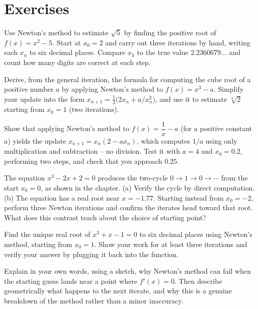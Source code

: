 \section{Exercises}
\label{ch19:exercises}

\begin{exercise}
Use Newton's method to estimate $\sqrt5$ by finding the positive root of
$f(x) = x^2 - 5$. Start at $x_0 = 2$ and carry out three iterations by hand, writing
each $x_n$ to six decimal places. Compare $x_3$ to the true value $2.2360679\ldots$
and count how many digits are correct at each step.
\end{exercise}

\begin{exercise}
Derive, from the general iteration, the formula for computing the cube root of a
positive number $a$ by applying Newton's method to $f(x) = x^3 - a$. Simplify your
update into the form $x_{n+1} = \tfrac13\bigl(2x_n + a/x_n^2\bigr)$, and use it to
estimate $\sqrt[3]{2}$ starting from $x_0 = 1$ (two iterations).
\end{exercise}

\begin{exercise}
Show that applying Newton's method to $f(x) = \dfrac1x - a$ (for a positive constant
$a$) yields the update $x_{n+1} = x_n(2 - a x_n)$, which computes $1/a$ using only
multiplication and subtraction -- no division. Test it with $a = 4$ and $x_0 = 0.2$,
performing two steps, and check that you approach $0.25$.
\end{exercise}

\begin{exercise}
The equation $x^3 - 2x + 2 = 0$ produces the two-cycle $0 \to 1 \to 0 \to \cdots$ from
the start $x_0 = 0$, as shown in the chapter. (a) Verify the cycle by direct
computation. (b) The equation has a real root near $x = -1.77$. Starting instead from
$x_0 = -2$, perform three Newton iterations and confirm the iterates head toward that
root. What does this contrast teach about the choice of starting point?
\end{exercise}

\begin{exercise}
Find the unique real root of $x^3 + x - 1 = 0$ to six decimal places using Newton's
method, starting from $x_0 = 1$. Show your work for at least three iterations and
verify your answer by plugging it back into the function.
\end{exercise}

\begin{exercise}[Conceptual]
Explain in your own words, using a sketch, why Newton's method can fail when the
starting guess lands near a point where $f'(x) = 0$. Then describe geometrically what
happens to the next iterate, and why this is a genuine breakdown of the method rather
than a minor inaccuracy.
\end{exercise}

